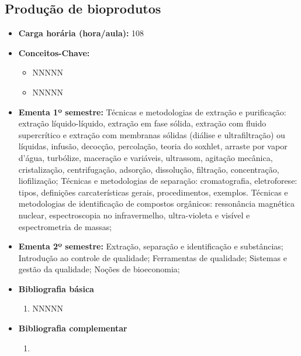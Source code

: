 \documentclass[11pt,fleqn]{book} %
\begin{document}
\subsection{Produção de bioprodutos}\label{disc:producao}
\begin{itemize}
	\item \textbf{Carga horária (hora/aula):} 108
	\item \textbf{Conceitos-Chave:}
	\begin{itemize}
		\item NNNNN
		\item NNNNN
	\end{itemize}
	\item \textbf{Ementa 1º semestre:}
	Técnicas e metodologias de extração e purificação: extração líquido-líquido, extração em fase sólida, extração com fluido supercrítico e extração com membranas sólidas (diálise e ultrafiltração) ou líquidas, infusão, decocção, percolação, teoria do soxhlet, arraste por vapor d’água, turbólize, maceração e variáveis, ultrassom, agitação mecânica, cristalização, centrifugação, adsorção, dissolução, filtração, concentração, liofilização; 
	Técnicas e metodologias de separação: cromatografia, eletroforese: tipos, definições carcaterísticas gerais, procedimentos, exemplos. 
	Técnicas e metodologias de identificação de compostos orgânicos: ressonância magnética nuclear, espectroscopia no infravermelho, ultra-violeta e visível e espectrometria de massas; 
	\item \textbf{Ementa 2º semestre:}
	Extração, separação e identificação e substâncias;
	Introdução ao controle de qualidade; 
	Ferramentas de qualidade; 
	Sistemas e gestão da qualidade;
	Noções de bioeconomia;
	\item \textbf{Bibliografia básica}
	\begin{enumerate}
		\item NNNNN
	\end{enumerate}
	\item \textbf{Bibliografia complementar}
	\begin{enumerate}
		\item 
	\end{enumerate}	
\end{itemize}


\newpage
\end{document}
